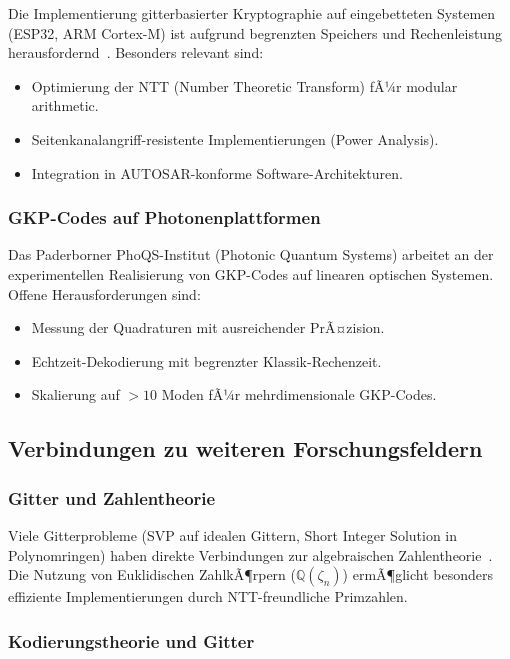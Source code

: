 ﻿\documentclass[a4paper,12pt]{article}
\theoremstyle{definition}
\begin{document}
Die Implementierung gitterbasierter Kryptographie auf eingebetteten Systemen
(ESP32, ARM Cortex-M) ist aufgrund begrenzten Speichers und Rechenleistung
herausfordernd~\cite{Epp2026Embedded}.
Besonders relevant sind:
\begin{itemize}
    \item Optimierung der NTT (Number Theoretic Transform) fÃ¼r modular arithmetic.
    \item Seitenkanalangriff-resistente Implementierungen (Power Analysis).
    \item Integration in AUTOSAR-konforme Software-Architekturen.
\end{itemize}

\subsubsection{GKP-Codes auf Photonenplattformen}

Das Paderborner PhoQS-Institut (Photonic Quantum Systems) arbeitet an der
experimentellen Realisierung von GKP-Codes auf linearen optischen Systemen.
Offene Herausforderungen sind:
\begin{itemize}
    \item Messung der Quadraturen mit ausreichender PrÃ¤zision.
    \item Echtzeit-Dekodierung mit begrenzter Klassik-Rechenzeit.
    \item Skalierung auf $>10$ Moden fÃ¼r mehrdimensionale GKP-Codes.
\end{itemize}

\subsection{Verbindungen zu weiteren Forschungsfeldern}

\subsubsection{Gitter und Zahlentheorie}

Viele Gitterprobleme (SVP auf idealen Gittern, Short Integer Solution in Polynomringen)
haben direkte Verbindungen zur algebraischen Zahlentheorie~\cite{PeikertRosen2007}.
Die Nutzung von Euklidischen ZahlkÃ¶rpern ($\mathbb{Q}(\zeta_n)$) ermÃ¶glicht
besonders effiziente Implementierungen durch NTT-freundliche Primzahlen.

\subsubsection{Kodierungstheorie und Gitter}
\end{document}
